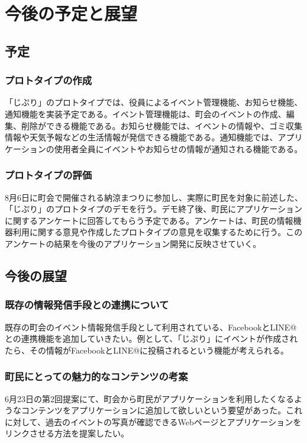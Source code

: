 \chapter{今後の予定と展望}

\section{予定}
\subsection{プロトタイプの作成}
「じぷり」のプロトタイプでは、役員によるイベント管理機能、お知らせ機能、通知機能を実装予定である。イベント管理機能は、町会のイベントの作成、編集、削除ができる機能である。お知らせ機能では、イベントの情報や、ゴミ収集情報や天気予報などの生活情報が発信できる機能である。通知機能では、アプリケーションの使用者全員にイベントやお知らせの情報が通知される機能である。
\subsection{プロトタイプの評価}
8月6日に町会で開催される納涼まつりに参加し、実際に町民を対象に前述した、「じぷり」のプロトタイプのデモを行う。デモ終了後、町民にアプリケーションに関するアンケートに回答してもらう予定である。アンケートは、町民の情報機器利用に関する意見や作成したプロトタイプの意見を収集するために行う。このアンケートの結果を今後のアプリケーション開発に反映させていく。

\section{今後の展望}
\subsection{既存の情報発信手段との連携について}
既存の町会のイベント情報発信手段として利用されている、FacebookとLINE@との連携機能を追加していきたい。例として、「じぷり」にイベントが作成されたら、その情報がFacebookとLINE@に投稿されるという機能が考えられる。
\subsection{町民にとっての魅力的なコンテンツの考案}
6月23日の第2回提案にて、町会から町民がアプリケーションを利用したくなるようなコンテンツをアプリケーションに追加して欲しいという要望があった。これに対して、過去のイベントの写真が確認できるWebページとアプリケーションをリンクさせる方法を提案したい。
